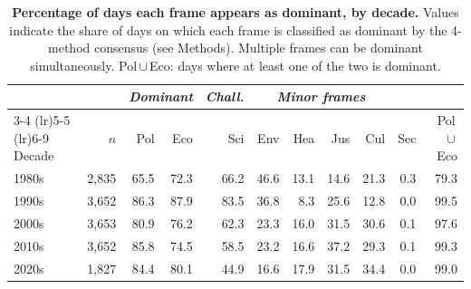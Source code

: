 \begin{table}[h]
\centering
\renewcommand{\arraystretch}{1.15}
\caption{\textbf{Percentage of days each frame appears as dominant, by decade.}
Values indicate the share of days on which each frame is classified as dominant
by the 4-method consensus (see Methods). Multiple frames can be dominant
simultaneously. Pol\,$\cup$\,Eco: days where at least one of the two is dominant.}
\label{tab:si_dominance_decades}
\vspace{0.3em}
\footnotesize
\begin{tabular}{@{}l r rr r rrrr r r@{}}
\toprule
& & \multicolumn{2}{c}{\textit{Dominant}} & \textit{Chall.}
& \multicolumn{4}{c}{\textit{Minor frames}} & & \\
\cmidrule(lr){3-4} \cmidrule(lr){5-5} \cmidrule(lr){6-9}
Decade & $n$ & Pol & Eco & Sci & Env & Hea & Jus & Cul & Sec
& Pol\,$\cup$\,Eco \\
\midrule
1980s & 2,835 & 65.5 & 72.3 & 66.2 & 46.6 & 13.1 & 14.6 & 21.3 & 0.3 & 79.3 \\
1990s & 3,652 & 86.3 & 87.9 & 83.5 & 36.8 & 8.3 & 25.6 & 12.8 & 0.0 & 99.5 \\
2000s & 3,653 & 80.9 & 76.2 & 62.3 & 23.3 & 16.0 & 31.5 & 30.6 & 0.1 & 97.6 \\
2010s & 3,652 & 85.8 & 74.5 & 58.5 & 23.2 & 16.6 & 37.2 & 29.3 & 0.1 & 99.3 \\
2020s & 1,827 & 84.4 & 80.1 & 44.9 & 16.6 & 17.9 & 31.5 & 34.4 & 0.0 & 99.0 \\
\bottomrule
\end{tabular}
\end{table}